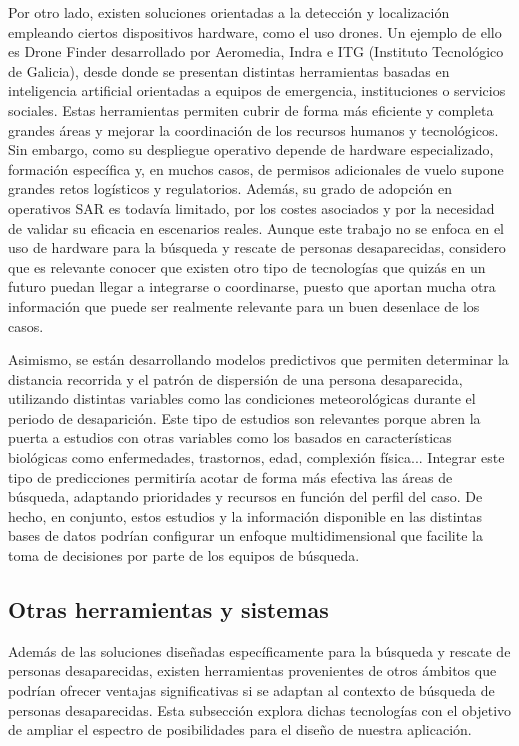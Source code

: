     Por otro lado, existen soluciones orientadas a la detección y localización empleando ciertos dispositivos hardware, como el uso drones. Un ejemplo de ello es Drone Finder\cite{dronefinder} desarrollado por Aeromedia, Indra e ITG (Instituto Tecnológico de Galicia), desde donde se presentan distintas herramientas basadas en inteligencia artificial orientadas a equipos de emergencia, instituciones o servicios sociales. Estas herramientas permiten cubrir de forma más eficiente y completa grandes áreas y mejorar la coordinación de los recursos humanos y tecnológicos. Sin embargo, como su despliegue operativo depende de hardware especializado, formación específica y, en muchos casos, de permisos adicionales de vuelo supone grandes retos logísticos y regulatorios. Además, su grado de adopción en operativos SAR es todavía limitado, por los costes asociados y por la necesidad de validar su eficacia en escenarios reales. Aunque este trabajo no se enfoca en el uso de hardware para la búsqueda y rescate de personas desaparecidas, considero que es relevante conocer que existen otro tipo de tecnologías que quizás en un futuro puedan llegar a integrarse o coordinarse, puesto que aportan mucha otra información que puede ser realmente relevante para un buen desenlace de los casos. 
        
    Asimismo, se están desarrollando modelos predictivos que permiten determinar la distancia recorrida y el patrón de dispersión de una persona desaparecida, utilizando distintas variables como las condiciones meteorológicas durante el periodo de desaparición\cite{DistanciaTiempoMeteo}. Este tipo de estudios son relevantes porque abren la puerta a estudios con otras variables como los basados en características biológicas como enfermedades, trastornos, edad, complexión física... Integrar este tipo de predicciones permitiría acotar de forma más efectiva las áreas de búsqueda, adaptando prioridades y recursos en función del perfil del caso. De hecho, en conjunto, estos estudios y la información disponible en las distintas bases de datos podrían configurar un enfoque multidimensional que facilite la toma de decisiones por parte de los equipos de búsqueda.
    
    
    \subsection{Otras herramientas y sistemas}
    Además de las soluciones diseñadas específicamente para la búsqueda y rescate de personas desaparecidas, existen herramientas provenientes de otros ámbitos que podrían ofrecer ventajas significativas si se adaptan al contexto de búsqueda de personas desaparecidas. Esta subsección explora dichas tecnologías con el objetivo de ampliar el espectro de posibilidades para el diseño de nuestra aplicación.

